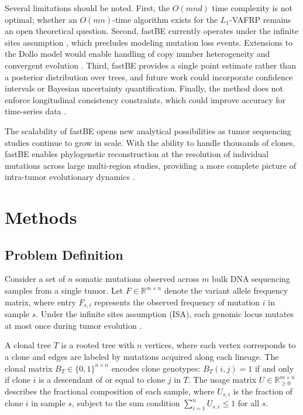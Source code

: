 \documentclass[11pt]{article}
\begin{document}
Several limitations should be noted. First, the $O(mnd)$ time complexity is not optimal; whether an $O(mn)$-time algorithm exists for the $L_1$-VAFRP remains an open theoretical question. Second, fastBE currently operates under the infinite sites assumption \citep{kimura1969number}, which precludes modeling mutation loss events. Extensions to the Dollo model would enable handling of copy number heterogeneity and convergent evolution \citep{satas2020scarlet}. Third, fastBE provides a single point estimate rather than a posterior distribution over trees, and future work could incorporate confidence intervals or Bayesian uncertainty quantification. Finally, the method does not enforce longitudinal consistency constraints, which could improve accuracy for time-series data \citep{myers2022calder}.

The scalability of fastBE opens new analytical possibilities as tumor sequencing studies continue to grow in scale. With the ability to handle thousands of clones, fastBE enables phylogenetic reconstruction at the resolution of individual mutations across large multi-region studies, providing a more complete picture of intra-tumor evolutionary dynamics \citep{black2021aberrant, turajlic2019resolving}.

\section{Methods}

\subsection{Problem Definition}

Consider a set of $n$ somatic mutations observed across $m$ bulk DNA sequencing samples from a single tumor. Let $F \in \mathbb{R}^{m \times n}$ denote the variant allele frequency matrix, where entry $F_{s,i}$ represents the observed frequency of mutation $i$ in sample $s$. Under the infinite sites assumption (ISA), each genomic locus mutates at most once during tumor evolution \citep{kimura1969number}.

A clonal tree $T$ is a rooted tree with $n$ vertices, where each vertex corresponds to a clone and edges are labeled by mutations acquired along each lineage. The clonal matrix $B_T \in \{0,1\}^{n \times n}$ encodes clone genotypes: $B_T(i,j) = 1$ if and only if clone $i$ is a descendant of or equal to clone $j$ in $T$. The usage matrix $U \in \mathbb{R}^{m \times n}_{\geq 0}$ describes the fractional composition of each sample, where $U_{s,i}$ is the fraction of clone $i$ in sample $s$, subject to the sum condition $\sum_{i=1}^n U_{s,i} \leq 1$ for all $s$.
\end{document}

